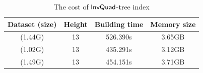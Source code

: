 




\begin{table}
	\centering
	\small
	\caption{The cost of $\mathsf{InvQuad}$-tree index}
	\vspace{-3mm}
	\begin{tabular}{|c|c|c|c|} \hline
		Dataset (size) & Height & Building time & Memory size \\ \hline
		\pt{} (1.44G)	& 13 & 526.390s & 3.65GB  \\ \hline
		\sz{} (1.02G)	& 13 & 435.291s  & 3.12GB \\ \hline
		\cd{} (1.49G)	& 13 & 454.151s & 3.71GB \\ \hline
	\end{tabular}	\label{tab:index cost}
	\trim \trim \trim
\end{table}

